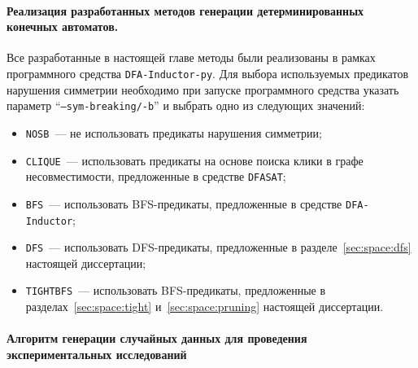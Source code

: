 
\paragraph*{Реализация разработанных методов генерации детерминированных конечных автоматов.}
\label{sec:space:results:impl}

Все разработанные в настоящей главе методы были реализованы в рамках программного средства \texttt{DFA-Inductor-py}.
Для выбора используемых предикатов нарушения симметрии необходимо при запуске программного средства указать параметр ``\texttt{--sym-breaking/-b}'' и выбрать одно из следующих значений:
\begin{itemize}
  \item \texttt{NOSB}~--- не использовать предикаты нарушения симметрии;
  \item \texttt{CLIQUE}~--- использовать предикаты на основе поиска клики в графе несовместимости, предложенные в средстве \texttt{DFASAT};
  \item \texttt{BFS}~--- использовать BFS-предикаты, предложенные в средстве \texttt{DFA-Inductor};
  \item \texttt{DFS}~--- использовать DFS-предикаты, предложенные в разделе~\ref{sec:space:dfs} настоящей диссертации;
  \item \texttt{TIGHTBFS}~--- использовать BFS-предикаты, предложенные в разделах~\ref{sec:space:tight} и~\ref{sec:space:pruning} настоящей диссертации.
\end{itemize}


\paragraph*{Алгоритм генерации случайных данных для проведения экспериментальных исследований}
\label{sec:space:results:random-input}

